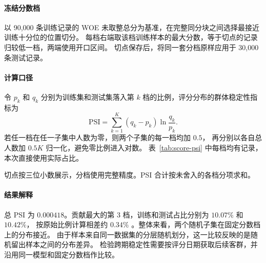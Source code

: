 \paragraph{冻结分数档}
以 90,000 条训练记录的 WOE 未取整总分为基准，在完整同分块之间选择最接近训练十分位的位置切分。
每档右端取该档训练样本的最大分数，等于切点的记录归较低一档，两端使用开口区间。
切点保存后，将同一套分档原样应用于 30,000 条测试记录。

\paragraph{计算口径}
令 $p_k$ 和 $q_k$ 分别为训练集和测试集落入第 $k$ 档的比例，评分分布的群体稳定性指标为
\[
  \mathrm{PSI}=\sum_{k=1}^{K}(q_k-p_k)\ln\frac{q_k}{p_k}.
\]
若任一档在任一子集中人数为零，则两个子集的每一档均加 $0.5$，
再分别以各自总人数加 $0.5K$ 归一化，避免零比例进入对数。
表~\ref{tab:score-psi} 中每档均有记录，本次直接使用实际占比。

\begin{table}[H]
  \centering
  \caption{训练集与测试集的固定分数档占比及 PSI}
  \label{tab:score-psi}
  \small
  \setlength{\tabcolsep}{5pt}
  
  \smallskip

  \parbox{0.95\linewidth}{\small 切点按三位小数展示，分档使用完整精度。PSI 合计按未舍入的各档分项求和。}
\end{table}

\paragraph{结果解释}
总 PSI 为 $0.000418$。贡献最大的第 3 档，训练和测试占比分别为 $10.07\%$ 和 $10.42\%$，
按原始比例计算相差约 $0.34\%$ 。整体来看，两个随机子集在固定分数档上的分布接近。
由于样本来自同一数据集的分层随机划分，这一比较反映的是随机留出样本之间的分布差异。
检验跨期稳定性需要按评分日期获取后续客群，并沿用同一模型和固定分数档作比较。
